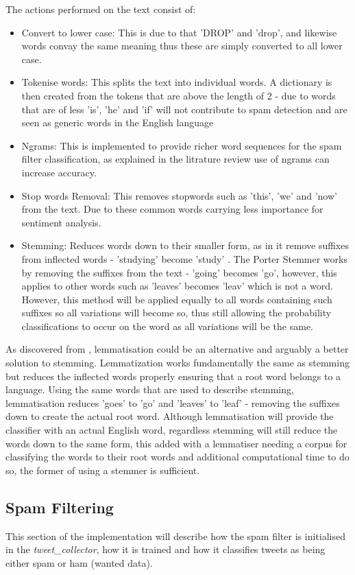 \documentclass[oneside, 12pt]{article}
\begin{document}
			The actions performed on the text consist of:
			\begin{itemize}
				\item Convert to lower case: This is due to that 'DROP' and 'drop', and likewise words convay the same meaning thus these are simply converted to all lower case.
				\item Tokenise words: This splits the text into individual words. A dictionary is then created from the tokens that are above the length of 2 - due to words that are of less 'is', 'he' and 'if' will not contribute to spam detection and are seen as generic words in the English language
				\item Ngrams: This is implemented to provide richer word sequences for the spam filter classification, as explained in the litrature review use of ngrams can increase accuracy.
				\item Stop words Removal: This removes stopwords such as 'this', 'we' and 'now' from the text. Due to these common words carrying less importance for sentiment analysis.
				\item Stemming: Reduces words down to their smaller form, as in it remove suffixes from inflected words - 'studying' become 'study' \cite{40}. The Porter Stemmer works by removing the suffixes from the text - 'going' becomes 'go', however, this applies to other words such as 'leaves' becomes 'leav' which is not a word. However, this method will be applied equally to all words containing such suffixes so all variations will become so, thus still allowing the probability classifications to occur on the word as all variations will be the same. 
			\end{itemize}
			
			As discovered from \cite{40}, lemmatisation could be an alternative and arguably a better solution to stemming. Lemmatization works fundamentally the same as stemming but reduces the inflected words properly ensuring that a root word belongs to a language. Using the same words that are used to describe stemming, lemmatisation reduces 'goes' to 'go' and 'leaves' to 'leaf' - removing the suffixes down to create the actual root word.
			Although lemmatisation will provide the classifier with an actual English word, regardless stemming will still reduce the words down to the same form, this added with a lemmatiser needing a corpus for classifying the words to their root words and additional computational time to do so, the former of using a stemmer is sufficient.
			\newpage
		\subsection{Spam Filtering}
			This section of the implementation will describe how the spam filter is initialised in the \textit{tweet\_collector}, how it is trained and how it classifies tweets as being either spam or ham (wanted data).
			
\end{document}
